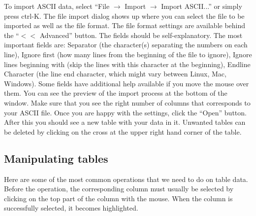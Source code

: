 \documentclass[byrevtex,amssymb,aps,pra,floatfix,letterpaper]{revtex4}
\begin{document}
To import ASCII data, select ``File $\rightarrow$ Import $\rightarrow$ Import ASCII...'' or simply press ctrl-K. The file import dialog shows up where you can select the file to be imported as well as the file format. The file format settings are available behind the ``$<<$ Advanced'' button. The fields should be self-explanatory. The most important fields are: Separator (the character(s) separating the numbers on each line), Ignore first (how many lines from the beginning of the file to ignore), Ignore lines beginning with (skip the lines with this character at the beginning), Endline Character (the line end character, which might vary between Linux, Mac, Windows). Some fields have additional help available if you move the mouse over them. You can see the preview of the import process at the bottom of the window. Make sure that you see the right number of columns that corresponds to your ASCII file. Once you are happy with the settings, click the ``Open'' button. After this you should see a new table with your data in it. Unwanted tables can be deleted by clicking on the cross at the upper right hand corner of the table.

\subsection{Manipulating tables}

Here are some of the most common operations that we need to do on table data. Before the operation, the corresponding column must usually be selected by clicking on the top part of the column with the mouse. When the column is successfully selected, it becomes highlighted.
\end{document}

